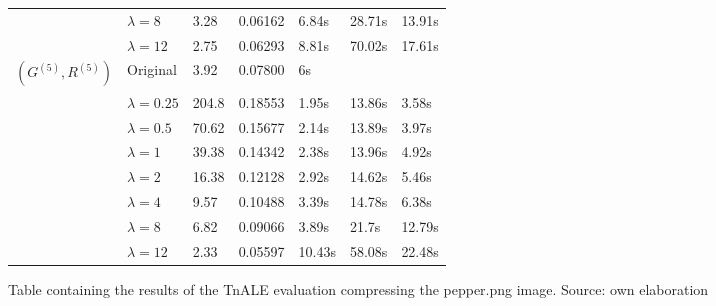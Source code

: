 \documentclass[11pt,a4paper,openright,oneside]{book}
\numberwithin{equation}{section}
\begin{document}
{\begin{figure}[h]
\begin{adjustwidth}{-30pt}{-30pt}
\begin{tabular}{lllllll}
                     & $\lambda = 8$    & 3.28   & 0.06162    & 6.84s  & 28.71s            & 13.91s             \\
                     & $\lambda = 12$   & 2.75   & 0.06293    & 8.81s  & 70.02s            & 17.61s             \\ \hline
$(G^{(5)}, R^{(5)})$ & Original         & 3.92   & 0.07800    & 6s     &                   &                    \\
                     & $\lambda = 0.25$ & 204.8  & 0.18553    & 1.95s  & 13.86s            & 3.58s              \\
                     & $\lambda = 0.5$  & 70.62  & 0.15677    & 2.14s  & 13.89s            & 3.97s              \\
                     & $\lambda = 1$    & 39.38  & 0.14342    & 2.38s  & 13.96s            & 4.92s              \\
                     & $\lambda = 2$    & 16.38  & 0.12128    & 2.92s  & 14.62s            & 5.46s              \\
                     & $\lambda = 4$    & 9.57   & 0.10488    & 3.39s  & 14.78s            & 6.38s              \\
                     & $\lambda = 8$    & 6.82   & 0.09066    & 3.89s  & 21.7s             & 12.79s             \\
                     & $\lambda = 12$   & 2.33   & 0.05597    & 10.43s & 58.08s            & 22.48s            
\end{tabular}

\end{adjustwidth}

\caption{Table containing the results of the TnALE evaluation compressing the pepper.png image. Source: own elaboration}
\label{fig:ap-lots-of-numbers}
\end{figure}

\begin{figure}[h]

\begin{adjustwidth}{-3cm}{-3cm}


\end{adjustwidth}
\end{figure}}
\end{document}
